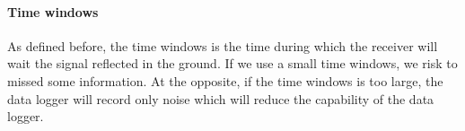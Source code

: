 \paragraph{Time windows} As defined before, the time windows is the time during which the receiver will wait the signal reflected in the ground. If we use a small time windows, we risk to missed some information. At the opposite, if the time windows is too large, the data logger will record only noise which will reduce the capability of the data logger.
